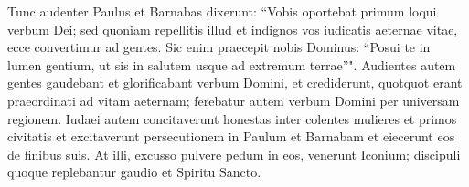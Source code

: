 \begin{biblechapter}
\verse Tunc audenter Paulus et Barnabas dixerunt: “Vobis oportebat primum loqui verbum Dei; sed quoniam repellitis illud et indignos vos iudicatis aeternae vitae, ecce convertimur ad gentes. 
\verse Sic enim praecepit nobis Dominus: “Posui te in lumen gentium, ut sis in salutem usque ad extremum terrae”". 
\verse Audientes autem gentes gaudebant et glorificabant verbum Domini, et crediderunt, quotquot erant praeordinati ad vitam aeternam; 
\verse ferebatur autem verbum Domini per universam regionem. 
\verse Iudaei autem concitaverunt honestas inter colentes mulieres et primos civitatis et excitaverunt persecutionem in Paulum et Barnabam et eiecerunt eos de finibus suis. 
\verse At illi, excusso pulvere pedum in eos, venerunt Iconium; 
\verse discipuli quoque replebantur gaudio et Spiritu Sancto. 
\end{biblechapter}

